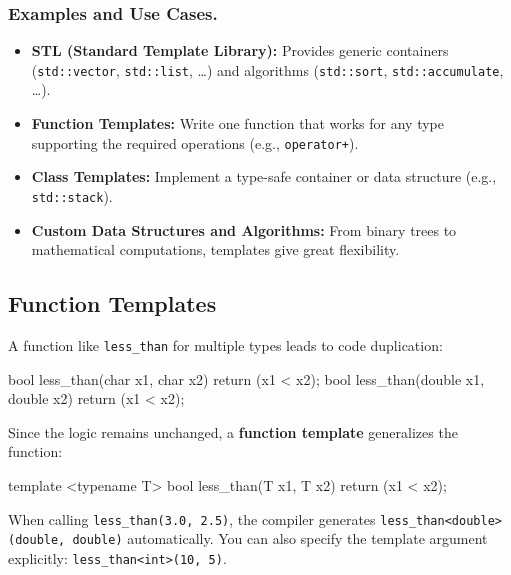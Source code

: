 \subsubsection{Examples and Use Cases.}
\begin{itemize}
    \item \textbf{STL (Standard Template Library):} Provides generic containers (\texttt{std::vector}, \texttt{std::list}, \dots) and algorithms (\texttt{std::sort}, \texttt{std::accumulate}, \dots).
    \item \textbf{Function Templates:} Write one function that works for any type supporting the required operations (e.g., \texttt{operator+}).
    \item \textbf{Class Templates:} Implement a type-safe container or data structure (e.g., \texttt{std::stack}).
    \item \textbf{Custom Data Structures and Algorithms:} From binary trees to mathematical computations, templates give great flexibility.
\end{itemize}


\subsection{Function Templates}

\begin{exampleblock}
A function like \texttt{less\_than} for multiple types leads to code duplication:

\begin{codeblock}[language=C++]
bool less_than(char x1, char x2) { return (x1 < x2); }
bool less_than(double x1, double x2) { return (x1 < x2); }
\end{codeblock}

Since the logic remains unchanged, a \textbf{function template} generalizes the function:

\begin{codeblock}[language=C++]
template <typename T>
bool less_than(T x1, T x2) { return (x1 < x2); }
\end{codeblock}

When calling \texttt{less\_than(3.0, 2.5)}, the compiler generates \texttt{less\_than<double>(double, double)} automatically. You can also specify the template argument explicitly: \texttt{less\_than<int>(10, 5)}.

\end{exampleblock}


